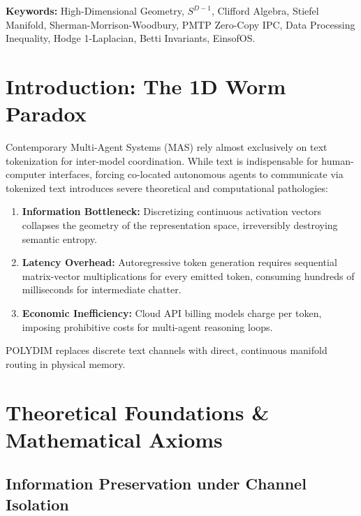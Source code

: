 \documentclass[11pt,twoside,a4paper]{article}
\theoremstyle{plain}
\theoremstyle{definition}
\theoremstyle{remark}
\begin{document}
\vspace{0.8cm}
\noindent\textbf{Keywords:} High-Dimensional Geometry, $S^{D-1}$, Clifford Algebra, Stiefel Manifold, Sherman-Morrison-Woodbury, PMTP Zero-Copy IPC, Data Processing Inequality, Hodge 1-Laplacian, Betti Invariants, EinsofOS.

\newpage
\tableofcontents
\newpage

\section{Introduction: The 1D Worm Paradox}
\label{sec:intro}

Contemporary Multi-Agent Systems (MAS) rely almost exclusively on text tokenization for inter-model coordination. While text is indispensable for human-computer interfaces, forcing co-located autonomous agents to communicate via tokenized text introduces severe theoretical and computational pathologies:

\begin{enumerate}
    \item \textbf{Information Bottleneck:} Discretizing continuous activation vectors collapses the geometry of the representation space, irreversibly destroying semantic entropy.
    \item \textbf{Latency Overhead:} Autoregressive token generation requires sequential matrix-vector multiplications for every emitted token, consuming hundreds of milliseconds for intermediate chatter.
    \item \textbf{Economic Inefficiency:} Cloud API billing models charge per token, imposing prohibitive costs for multi-agent reasoning loops.
\end{enumerate}

POLYDIM replaces discrete text channels with direct, continuous manifold routing in physical memory.

\section{Theoretical Foundations & Mathematical Axioms}
\label{sec:theory}

\subsection{Information Preservation under Channel Isolation}
\end{document}

